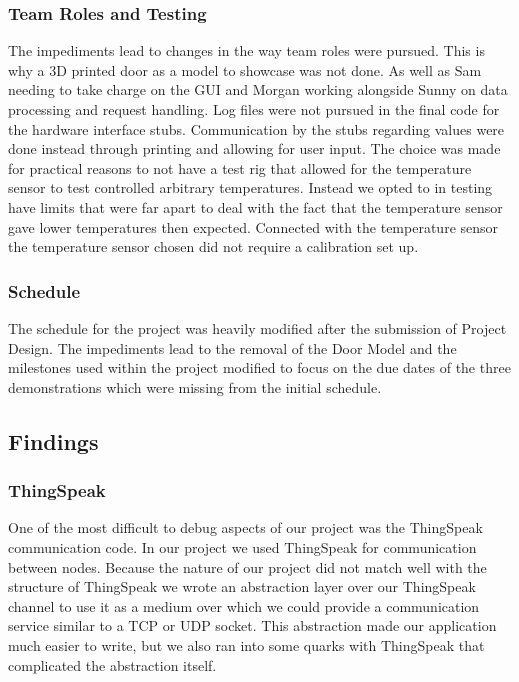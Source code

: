 \subsubsection{Team Roles and Testing}

 The impediments lead to changes in the way team roles were pursued. This is why a 3D printed door as a model to showcase was not done. As well as Sam needing to take charge on the GUI and Morgan working alongside Sunny on data processing and request handling. Log files were not pursued in the final code for the hardware interface stubs. Communication by the stubs regarding values were done instead through printing and allowing for user input. The choice was made for practical reasons to not have a test rig that allowed for the temperature sensor to test controlled arbitrary temperatures. Instead we opted to in testing have limits that were far apart to deal with the fact that the temperature sensor gave lower temperatures then expected. Connected with the temperature sensor the temperature sensor chosen did not require a calibration set up.
\subsubsection{Schedule}

The schedule for the project was heavily modified after the submission of Project Design. The impediments lead to the removal of the Door Model and the milestones used within the project modified to focus on the due dates of the three demonstrations which were missing from the initial schedule.

\subsection{Findings}


\subsubsection{ThingSpeak}

One of the most difficult to debug aspects of our project was the ThingSpeak
communication code. In our project we used ThingSpeak for communication between
nodes. Because the nature of our project did not match well with the structure
of ThingSpeak we wrote an abstraction layer over our ThingSpeak channel to
use it as a medium over which we could provide a communication service similar
to a TCP or UDP socket. This abstraction made our application much easier to
write, but we also ran into some quarks with ThingSpeak that complicated the
abstraction itself.


